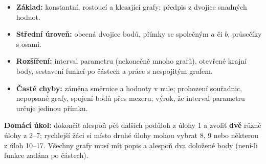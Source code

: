 \documentclass[11pt,a4paper]{article}
\begin{document}
\begin{itemize}
\item \textbf{Základ:} konstantní, rostoucí a klesající grafy; předpis z dvojice snadných hodnot.
\item \textbf{Střední úroveň:} obecná dvojice bodů, přímky se společným $a$ či $b$, průsečíky s osami.
\item \textbf{Rozšíření:} interval parametru (nekonečně mnoho grafů), otevřené krajní body, sestavení funkcí po částech a práce s nespojitým grafem.
\item \textbf{Časté chyby:} záměna směrnice a hodnoty v nule; prohození souřadnic, nepopsané grafy, spojení bodů přes mezeru; výrok, že interval parametru určuje jedinou přímku.
\end{itemize}
\textbf{Domácí úkol:} dokončit alespoň pět dalších podúloh z úlohy 1 a zvolit \textbf{dvě} různé úlohy z 2--7; rychlejší žáci si místo druhé úlohy mohou vybrat 8, 9 nebo některou z úloh 10--17. Všechny grafy musí mít popis a alespoň dva doložené body (není-li funkce zadána po částech).
\end{document}
